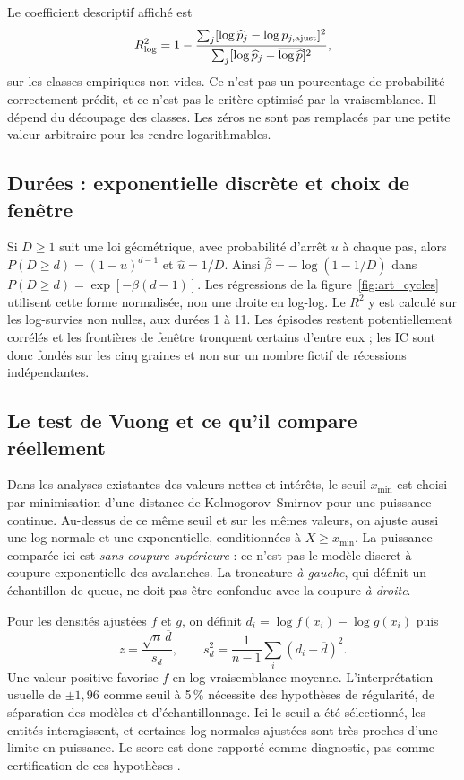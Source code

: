 Le coefficient descriptif affiché est
\[
 R^2_{\log}=1-
 \frac{\sum_j[\log\widehat p_j-\log p_{j,\rm ajust}]^2}
      {\sum_j[\log\widehat p_j-\overline{\log\widehat p}]^2},
\]
sur les classes empiriques non vides. Ce n'est pas un pourcentage
de probabilité correctement prédit, et ce n'est pas le critère
optimisé par la vraisemblance. Il dépend du découpage des classes.
Les zéros ne sont pas remplacés par une petite valeur arbitraire
pour les rendre logarithmables.

\subsection{Durées : exponentielle discrète et choix de fenêtre}
Si $D\ge1$ suit une loi géométrique, avec probabilité d'arrêt $u$ à
chaque pas, alors $P(D\ge d)=(1-u)^{d-1}$ et
$\widehat u=1/\overline D$. Ainsi
$\widehat\beta=-\log(1-1/\overline D)$ dans
$P(D\ge d)=\exp[-\beta(d-1)]$.
Les régressions de la figure~\ref{fig:art_cycles} utilisent cette
forme normalisée, non une droite en log-log. Le $R^2$ y est calculé
sur les log-survies non nulles, aux durées 1 à 11. Les épisodes restent
potentiellement corrélés et les frontières de fenêtre tronquent certains
d'entre eux ; les IC sont donc fondés sur les cinq graines et non sur
un nombre fictif de récessions indépendantes.

\subsection{Le test de Vuong et ce qu'il compare réellement}
Dans les analyses existantes des valeurs nettes et intérêts, le seuil
$x_{\min}$ est choisi par minimisation d'une distance de
Kolmogorov--Smirnov pour une puissance continue. Au-dessus de ce même
seuil et sur les mêmes valeurs, on ajuste aussi une log-normale et
une exponentielle, conditionnées à $X\ge x_{\min}$.
La puissance comparée ici est \emph{sans coupure supérieure} : ce
n'est pas le modèle discret à coupure exponentielle des avalanches.
La troncature \emph{à gauche}, qui définit un échantillon de queue,
ne doit pas être confondue avec la coupure \emph{à droite}.

Pour les densités ajustées $f$ et $g$, on définit
$d_i=\log f(x_i)-\log g(x_i)$ puis
\[
 z=\frac{\sqrt n\,\overline d}{s_d},\qquad
 s_d^2=\frac1{n-1}\sum_i(d_i-\overline d)^2.
\]
Une valeur positive favorise $f$ en log-vraisemblance moyenne.
L'interprétation usuelle de $\pm1{,}96$ comme seuil à 5\,\%
nécessite des hypothèses de régularité, de séparation des modèles
et d'échantillonnage. Ici le seuil a été sélectionné, les entités
interagissent, et certaines log-normales ajustées sont très proches
d'une limite en puissance. Le score est donc rapporté comme diagnostic,
pas comme certification de ces hypothèses \cite{vuong}.

